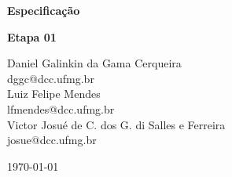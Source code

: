 \documentclass[a4paper,12pt]{report}
\begin{document}
\begin{titlepage}
\begin{center}
		\vspace*{-5.15cm}
		\LARGE{\textbf{Especificação}}
		\par\medskip\normalfont\Large\textbf{Etapa 01
		\linebreak}

		\begin{flushleft}
		\vspace{3cm}
		\large{\hfill Daniel Galinkin da Gama Cerqueira}\\
                \large{\hfill dggc@dcc.ufmg.br}\\
		\large{\hfill Luiz Felipe Mendes}\\
                \large{\hfill lfmendes@dcc.ufmg.br}\\
		\large{\hfill Victor Josué de C. dos G. di Salles e Ferreira}\\
                \large{\hfill josue@dcc.ufmg.br}\\
		\end{flushleft}

		\vspace{3cm}
		\today

	\end{center}
	\end{titlepage}

	\baselineskip 0.6cm
	\setlength{\parindent}{1.0cm}
	\medskip
	\tableofcontents












\nocite{wiki:UML, wiki:AD, wiki:UC, ian}


\end{document}
